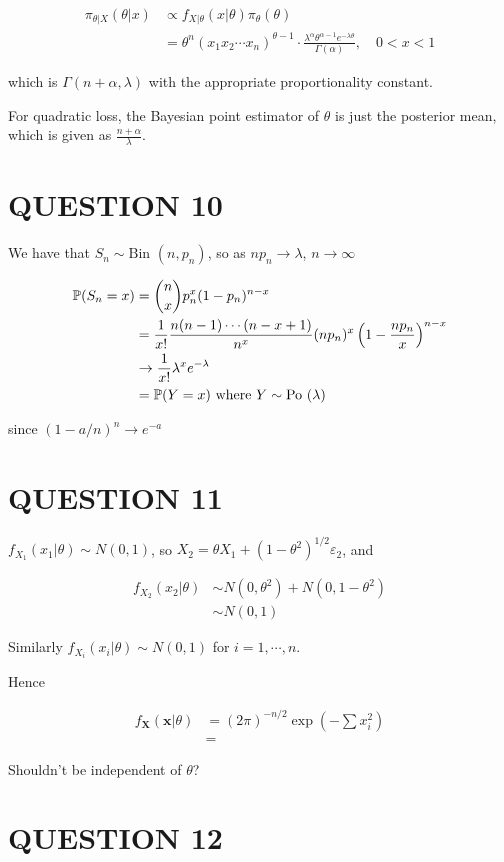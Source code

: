\documentclass[a4paper]{article}
\begin{document}
\begin{align*}
\pi_{\theta | X}(\theta | x) & \propto f_{X|\theta}(x|\theta) \pi_{\theta}(\theta) \\
& = \theta^{n} (x_{1}x_{2}\cdots x_{n})^{\theta-1} \cdot \frac{\lambda^{\alpha}\theta^{\alpha - 1} e^{- \lambda \theta}}{\Gamma (\alpha)}, \quad 0 < x < 1
\end{align*}

which is $ \Gamma(  n+\alpha,\lambda ) $ with the appropriate proportionality constant. 

For quadratic loss, the Bayesian point estimator of $ \theta $ is just the posterior mean, which is given as $ \frac{n + \alpha}{\lambda} $.


\section{QUESTION 10}

We have that $ S_{n} \sim \text{Bin }(n,p_{n}) $, so as $ np_{n} \to \lambda $, $ n \to \infty $

\begin{align*}
\P (S_{n} = x) & = \binom{n}{x}p_{n}^{x}(1-p_{n})^{n-x} \\
& = \frac{1}{x!} \frac{n(n-1)\cdots(n-x+1)}{n^{x}} (np_{n})^{x} \left( 1 - \frac{np_{n}}{x} \right)^{n-x} \\
& \to \frac{1}{x!} \lambda^{x} e^{-\lambda}   \\
& =   \P(Y=x) \text{ where } Y \sim   \text{Po }(\lambda)
\end{align*}

since $ (1-a/n)^{n} \to e^{-a} $

\section{QUESTION 11}

$ f_{X_{1}}(x_{1} | \theta) \sim N(0,1) $, so $ X_{2} = \theta X_{1} + (1- \theta^{2})^{1/2} \varepsilon_{2} $, and

\begin{align*}
f_{X_{2}}(x_{2} | \theta) & \sim N(0,\theta^{2}) + N(0,1-\theta^{2}) \\
& \sim N(0,1)
\end{align*}

Similarly $ f_{X_{i}}(x_{i} | \theta) \sim N(0,1) $ for $ i = 1,\cdots,n $.

Hence

\begin{align*}
f_{\mathbf{X}}(\mathbf{x} | \theta)& = (2\pi)^{-n/2} \exp\left( -\sum x_{i}^{2} \right)  \\
& = 
\end{align*}

Shouldn't be independent of $ \theta $?

\section{QUESTION 12}
\end{document}
